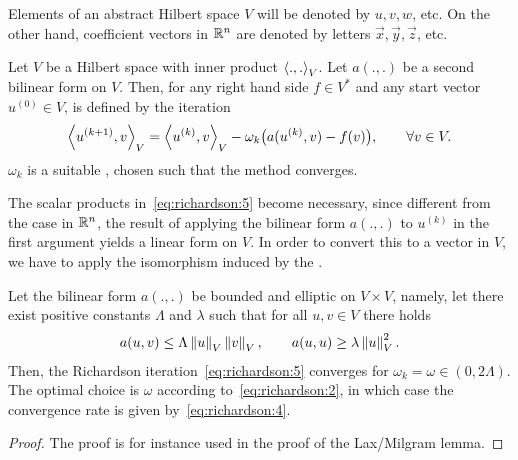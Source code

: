 \begin{intro}
  Elements of an abstract Hilbert space $V$ will be denoted by
  $u,v,w$, etc. On the other hand, coefficient vectors in $\mathbb R^n$ are
  denoted by letters $\vec x,\vec y,\vec z$, etc.
\end{intro}

\begin{definition}
  Let $V$ be a Hilbert space with inner product $\scal(.,.)_V$. Let
  $a(.,.)$ be a second bilinear form on $V$. Then, for any right hand
  side $f\in V^*$ and any start vector $u^{(0)}\in V$,
   is defined by the iteration
  \begin{gather}
    \label{eq:richardson:5}
    \scal(u^{(k+1)},v)_V = \scal(u^{(k)},v)_V
    - \omega_k \bigl(a(u^{(k)},v) - f(v)\bigr), \qquad \forall v\in V.
  \end{gather}
  $\omega_k$ is a suitable , chosen
  such that the method converges.
\end{definition}

\begin{note}
  The scalar products in~\eqref{eq:richardson:5} become necessary,
  since different from the case in $\mathbb R^n$, the result of applying the
  bilinear form $a(.,.)$ to $u^{(k)}$ in the first argument yields a
  linear form on $V$. In order to convert this to a vector in $V$, we
  have to apply the isomorphism induced by the .
\end{note}

\begin{theorem}
  Let the bilinear form $a(.,.)$ be bounded and elliptic on $V\times
  V$, namely, let there exist positive constants $\Lambda$ and $\lambda$ such
  that for all $u,v\in V$ there holds
  \begin{gather}
    \label{eq:richardson:6}
    a(u,v) \le \Lambda \left\|u\right\|_V \left\|v\right\|_V,
    \qquad
    a(u,u) \ge \lambda \left\|u\right\|_V^2.
  \end{gather}
  Then, the Richardson iteration~\eqref{eq:richardson:5} converges for
  $\omega_k = \omega \in (0, 2 \Lambda)$. The optimal
  choice is $\omega$ according to~\eqref{eq:richardson:2}, in which
  case the convergence rate is given by~\eqref{eq:richardson:4}.
\end{theorem}

\begin{proof} The proof is for instance used in the proof of the
  Lax/Milgram lemma.
\end{proof}

